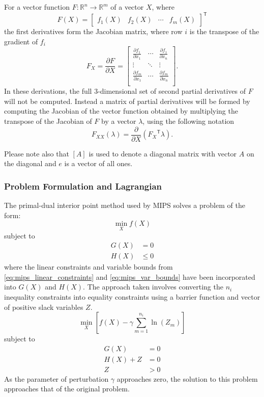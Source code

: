 \documentclass[12pt]{article}
\newcommand{\mips}[0]{{MIPS}}
\newcommand{\trans}[1]{{#1}^{\ensuremath{\mathsf{T}}}}  %
\newcommand{\diag}[1]{\left[{#1}\right]}                %
\newcommand{\R}{\mathbb{R}}          %
\newcommand{\der}[2]{\frac{\partial{#1}}{\partial{#2}}} %
\numberwithin{equation}{section}
\numberwithin{table}{section}
\numberwithin{figure}{section}
\begin{document}
\begin{appendices}
For a vector function $F \colon \R^n \to \R^m$ of a vector $X$, where
\begin{equation}
F(X) = \trans{\left[\begin{array}{cccc}
f_1(X) & f_2(X) & \cdots & f_m(X)
\end{array}\right]}
\end{equation}
the first derivatives form the Jacobian matrix, where row $i$ is the transpose of the gradient of $f_i$
\begin{equation}
F_X = \der{F}{X} = \left[\begin{array}{cccc}
\der{f_1}{x_1} &
\cdots &
\der{f_1}{x_n} \\
\vdots &
\ddots &
\vdots \\
\der{f_m}{x_1} &
\cdots &
\der{f_m}{x_n} \\
\end{array}\right].
\end{equation}
In these derivations, the full 3-dimensional set of second partial derivatives of $F$ will not be computed. Instead a matrix of partial derivatives will be formed by computing the Jacobian of the vector function obtained by multiplying the transpose of the Jacobian of $F$ by a vector $\lambda$, using the following notation
\begin{equation}
F_{XX}(\lambda) = \der{}{X} \left( \trans{F_X} \lambda \right).
\end{equation}

Please note also that $\diag{A}$ is used to denote a diagonal matrix with vector $A$ on the diagonal and $e$ is a vector of all ones.


\subsubsection{Problem Formulation and Lagrangian}

The primal-dual interior point method used by \mips{} solves a problem of the form:
\begin{equation}
\min_X f(X)
\end{equation}
subject to
\begin{align}
G(X) &= 0 \\
H(X) &\le 0
\end{align}
where the linear constraints and variable bounds from \eqref{eq:mips_linear_constraints} and \eqref{eq:mips_var_bounds} have been incorporated into $G(X)$ and $H(X)$. The approach taken involves converting the $n_i$ inequality constraints into equality constraints using a barrier function and vector of positive slack variables $Z$.
\begin{equation}
\min_X \left[f(X) - \gamma \sum_{m=1}^{n_i} \ln(Z_m)\right]
\end{equation}
subject to
\begin{align}
G(X) &= 0 \\
H(X) + Z &= 0 \\
Z &> 0
\end{align}
As the parameter of perturbation $\gamma$ approaches zero, the solution to this problem approaches that of the original problem.


\end{appendices}
\end{document}
